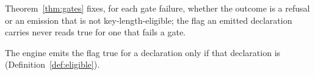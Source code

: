 
Theorem~\ref{thm:gates} fixes, for each gate failure, whether the outcome is a
refusal or an emission that is not key-length-eligible; the flag an emitted
declaration carries never reads true for one that fails a gate.

\begin{requirement}\label{req:eligibility-flag}
The engine emits the flag  true for a declaration
only if that declaration is 
(Definition~\ref{def:eligible}).
\end{requirement}
